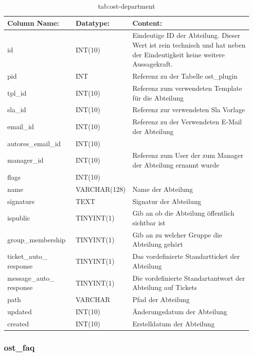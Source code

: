 \begin{table}[h]
	\begin{tabular}{|p{3.5cm}|p{4cm}|p{6.2cm}|}
		\hline
		\textbf{Column Name:} & \textbf{Datatype:} & \textbf{Content:}\\
		\hline
		id & INT(10) & Eindeutige ID der Abteilung. Dieser Wert ist rein technisch und hat  neben der Eindeutigkeit keine weitere 
		Aussagekraft.\\
		\hline
		pid & INT & Referenz zu der Tabelle ost\_plugin \\
		\hline
		tpl\_id & INT(10) & Referenz zum verwendeten Template für die Abteilung\\
		\hline
		sla\_id & INT(10) & Referenz zur verwendeten Sla Vorlage\\
		\hline
		email\_id & INT(10) & Referenz zu der Verwendeten E-Mail der Abteilung\\
		\hline
		autores\_email\_id & INT(10) & \\
		\hline
		manager\_id & INT(10) & Referenz zum User der zum Manager der Abteilung ernannt wurde\\
		\hline
		flags & INT(10) & \\
		\hline
		name & VARCHAR(128) & Name der Abteilung \\
		\hline
		signature & TEXT & Signatur der Abteilung \\
		\hline
		ispublic & TINYINT(1) & Gib an ob die Abteilung öffentlich sichtbar ist \\
		\hline
		group\_membership & TINYINT(1) & Gib an zu welcher Gruppe die Abteilung gehört \\
		\hline
		ticket\_auto\_ response & TINYINT(1) & Das vordefinierte Standartticket der Abteilung \\
		\hline
		message\_auto\_ response & TINYINT(1) & Die vordefinierte Standartantwort der Abteilung auf Tickets \\
		\hline
		path & VARCHAR & Pfad der Abteilung\\
		\hline
		updated & INT(10) & Änderungsdatum der Abteilung\\
		\hline
		created & INT(10) & Erstelldatum der Abteilung\\
		\hline
	\end{tabular}
	\caption{tab:ost-department}
\end{table}
\label{tab:ost_department}

\newpage


\subsubsection{ost\_faq}


